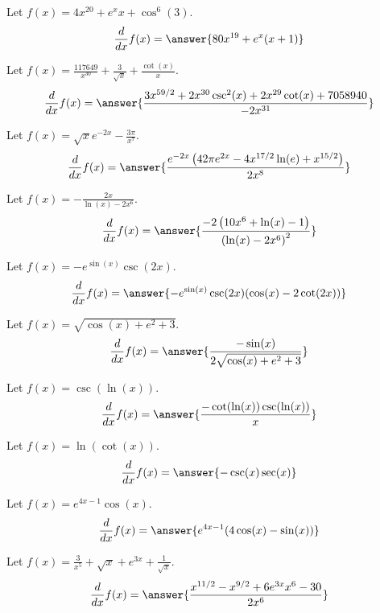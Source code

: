 \documentclass{ximera}
\begin{document}
\begin{shuffle}
\begin{exercise}
Let $f(x)=4 x^{20}+e^x x+\cos ^6(3)$.
\[
\ddx f(x) = \answer{80 x^{19}+e^x (x+1)}
\]
\end{exercise}

\begin{exercise}
Let $f(x)=\frac{117649}{x^{30}}+\frac{3}{\sqrt{x}}+\frac{\cot (x)}{x}$.
\[
\ddx f(x) = \answer{\frac{3 x^{59/2}+2 x^{30} \csc ^2(x)+2 x^{29} \cot (x)+7058940}{-2 x^{31}}}
\]
\end{exercise}

\begin{exercise}
Let $f(x)=\sqrt{x} e^{-2 x}-\frac{3 \pi }{x^7}$.
\[
\ddx f(x) = \answer{\frac{e^{-2 x} \left(42 \pi  e^{2 x}-4 x^{17/2} \ln (e)+x^{15/2}\right)}{2 x^8}}
\]
\end{exercise}

\begin{exercise}
Let $f(x)=-\frac{2 x}{\ln (x)-2 x^6}$.
\[
\ddx f(x) = \answer{\frac{-2 \left(10 x^6+\ln (x)-1\right)}{\left(\ln (x)-2 x^6\right)^2}}
\]
\end{exercise}

\begin{exercise}
Let $f(x)=-e^{\sin (x)} \csc (2 x)$.
\[
\ddx f(x) = \answer{-e^{\sin (x)} \csc (2 x) (\cos (x)-2 \cot (2 x))}
\]
\end{exercise}

\begin{exercise}
Let $f(x)=\sqrt{\cos (x)+e^2+3}$.
\[
\ddx f(x) = \answer{\frac{-\sin (x)}{2 \sqrt{\cos (x)+e^2+3}}}
\]
\end{exercise}

\begin{exercise}
Let $f(x)=\csc (\ln (x))$.
\[
\ddx f(x) = \answer{\frac{-\cot (\ln (x)) \csc (\ln (x))}{x}}
\]
\end{exercise}

\begin{exercise}
Let $f(x)=\ln (\cot (x))$.
\[
\ddx f(x) = \answer{-\csc (x) \sec (x)}
\]
\end{exercise}

\begin{exercise}
Let $f(x)=e^{4 x-1} \cos (x)$.
\[
\ddx f(x) = \answer{e^{4 x-1} (4 \cos (x)-\sin (x))}
\]
\end{exercise}

\begin{exercise}
Let $f(x)=\frac{3}{x^5}+\sqrt{x}+e^{3 x}+\frac{1}{\sqrt{x}}$.
\[
\ddx f(x) = \answer{\frac{x^{11/2}-x^{9/2}+6 e^{3 x} x^6-30}{2 x^6}}
\]
\end{exercise}


\end{shuffle}
\end{document}
